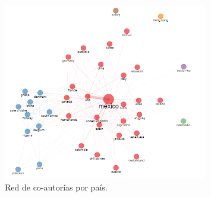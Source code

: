 \begin{figure}[ht]
	\centering
	\includegraphics[width=0.8\textwidth]{imagenes/net_pais.png}
	\caption{Red de co-autorías por país.}
	\label{fig:net_country}   
	
\end{figure}

